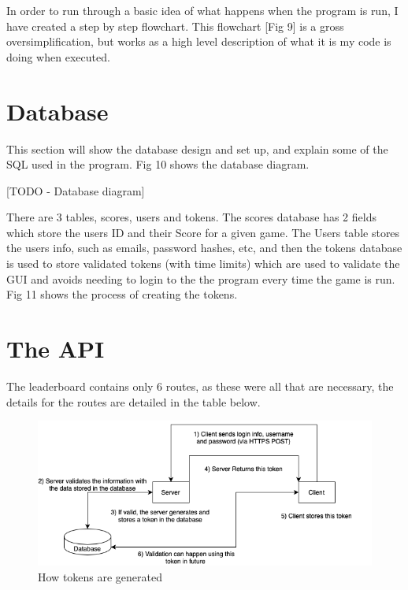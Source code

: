\documentclass[a4paper, 11pt]{report}
\begin{document}
In order to run through a basic idea of what happens when the program is run, I have created a step by step flowchart. This flowchart [Fig 9] is a gross oversimplification, but works as a high level description of what it is my code is doing when executed.

\section{Database}
This section will show the database design and set up, and explain some of the SQL used in the program. Fig 10 shows the database diagram.


[TODO - Database diagram]


There are 3 tables, scores, users and tokens. The scores database has 2 fields which store the users ID and their Score for a given game. The Users table stores the users info, such as emails, password hashes, etc, and then the tokens database is used to store validated tokens (with time limits) which are used to validate the GUI and avoids needing to login to the the program every time the game is run. Fig 11 shows the process of creating the tokens.

\section{The API}
The leaderboard contains only 6 routes, as these were all that are necessary, the details for the routes are detailed in the table below.

\begin{figure}[h!]
  \includegraphics[width=0.8\linewidth]{tokens.png}
  \centering
  \caption{How tokens are generated}
  \label{fig:tokens}
\end{figure}
\end{document}
